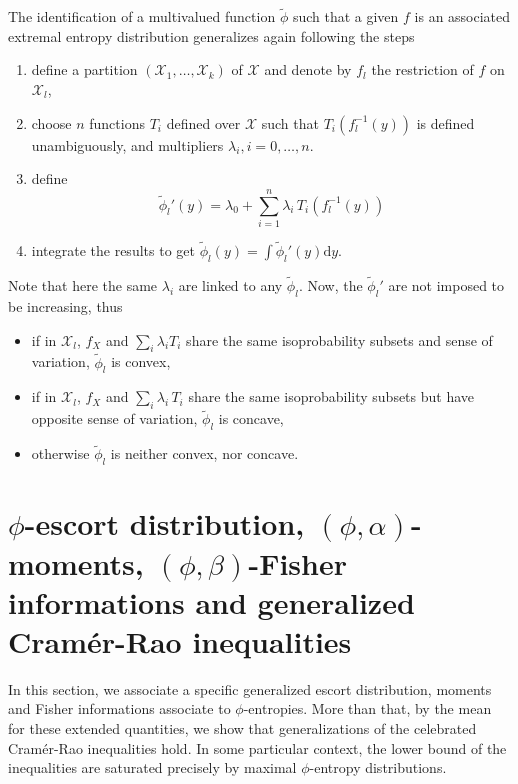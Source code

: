 \documentclass[english,sort&compress]{elsarticle}
\theoremstyle{definition}
\theoremstyle{plain}
\theoremstyle{plain}
\def\d{\mathrm{d}}
\def\X{\mathcal{X}}
\begin{document}
The  identification of  a multivalued  function $\widetilde{\phi}$  such  that a
given  $f$ is  an  associated extremal  entropy  distribution generalizes  again
following the steps
%
\begin{enumerate}
\item define  a partition $(\X_1,\ldots,\X_k)$ of  $\X$ and denote  by $f_l$ the
  restriction of $f$ on $\X_l$,
\item choose $n$ functions $T_i$  defined over $\X$ such that $T_i(f_l^{-1}(y))$
  is defined unambiguously, and multipliers $\lambda_i, i=0,\ldots,n$.
\item define
  \begin{equation}\label{eq:derivative-phil-notconcave}
  \widetilde{\phi}_l'(y) = \lambda_0 + \sum_{i=1}^n \lambda_i \,
  T_i\!\left(f_l^{-1}(y)\right)
  \end{equation}
\item integrate the results  to get ${\displaystyle \widetilde{\phi}_l(y) = \int
    \widetilde{\phi}_l'(y)\d y}$.
\end{enumerate}
%
Note  that here  the same  $\lambda_i$ are  linked to  any $\widetilde{\phi}_l$.
Now, the $\widetilde{\phi}_l'$ are not imposed to be increasing, thus
%
\begin{itemize}
\item  if  in   $\X_l$,  $f_X$  and  $\sum_i  \lambda_i   T_i$  share  the  same
  isoprobability subsets and sense of variation, $\widetilde{\phi}_l$ is convex,
\item  if  in  $\X_l$, $f_X$  and  $\sum_i  \lambda_i  \,  T_i$ share  the  same
  isoprobability    subsets   but    have   opposite    sense    of   variation,
  $\widetilde{\phi}_l$ is concave,
\item otherwise $\widetilde{\phi}_l$ is neither convex, nor concave. 
\end{itemize}



\section{$\phi$-escort           distribution,          $(\phi,\alpha)$-moments,
  $(\phi,\beta)$-Fisher informations and generalized Cram\'er-Rao inequalities}
\label{sec:EscortCR}

In  this  section, we  associate  a  specific  generalized escort  distribution,
moments and Fisher informations  associate to $\phi$-entropies.  More than that,
by the  mean for these extended  quantities, we show that  generalizations of the
celebrated Cram\'er-Rao inequalities hold. In some particular context, the lower
bound  of the  inequalities are  saturated precisely  by  maximal $\phi$-entropy
distributions.
\end{document}
